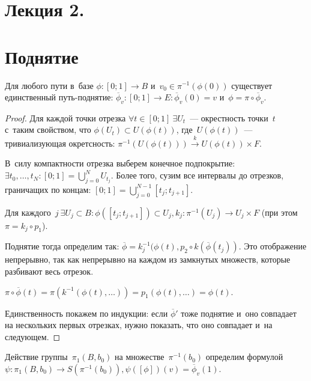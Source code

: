 \documentclass{article}
\begin{document}
\section*{Лекция 2. }

\resetcntrs

\section{Поднятие}

\begin{lemma}[О~поднятии]
	Для любого пути в~базе $\phi: [0; 1] \rightarrow B$ и~$v_0 \in
	\pi^{-1}(\phi(0))$ существует единственный путь-поднятие:
	$\overline{\phi}_v: [0; 1] \rightarrow E: \overline{\phi}_v(0) = v$
	и~$\phi = \pi \circ \overline{\phi}_v$.
\end{lemma}

\begin{proof}
	Для каждой точки отрезка $\forall t \in [0; 1]\ \exists U_t$~--- окрестность
	точки~$t$ с~таким свойством, что $\phi(U_t) \subset U(\phi(t))$,
	где~$U(\phi(t))$~--- тривиализующая окретсность: $\pi^{-1}(U(\phi(t)))
	\overset{k}\rightarrow U(\phi(t)) \times F$.

	В~силу компактности отрезка выберем конечное подпокрытие: $\exists t_0,
	\ldots, t_N: [0; 1] = \bigcup\limits_{j=0}^{N} U_{t_j}$. Более того, сузим все
	интервалы до отрезков, граничащих по концам: $[0; 1] =
	\bigcup\limits_{j=0}^{N-1} [t_j; t_{j+1}]$.

	Для каждого~$j\ \exists U_j \subset B: \phi([t_j; t_{j+1}]) \subset U_j, k_j:
	\pi^{-1}(U_j) \rightarrow U_j \times F$ (при этом $\pi = k_j \circ p_1$).

	Поднятие тогда определим так: $\overline{\phi} = k_j^{-1}(\phi(t), p_2 \circ
	k(\overline\phi(t_j))$. Это отображение непрерывно, так как непрерывно на
	каждом из замкнутых множеств, которые разбивают весь отрезок.

	$\pi \circ \overline\phi(t) = \pi(k^{-1}(\phi(t), \ldots)) = p_1(\phi(t),
	\ldots) = \phi(t)$.

	Единственность покажем по индукции: если $\overline\phi'$ тоже поднятие и~оно
	совпадает на нескольких первых отрезках, нужно показать, что оно совпадает
	и~на следующем.
\end{proof}
\begin{definition}
	Действие группы~$\pi_1(B, b_0)$ на множестве~$\pi^{-1}(b_0)$ определим
	формулой $\psi: \pi_1(B, b_0) \rightarrow S(\pi^{-1}(b_0)), \psi([\phi])(v) =
	\overline\phi_v(1)$.
\end{definition}
\end{document}
